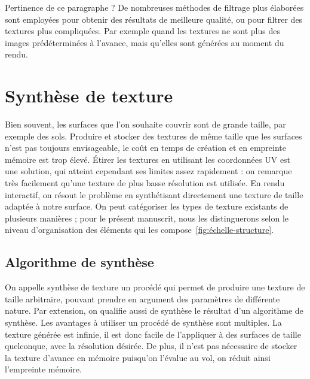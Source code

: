 {\color{red}Pertinence de ce paragraphe ?}
De nombreuses méthodes de filtrage plus élaborées sont employées pour obtenir des résultats de meilleure qualité, ou pour filtrer des textures plus compliquées. Par exemple quand les textures ne sont plus des images prédéterminées à l'avance, mais qu'elles sont générées au moment du rendu.

\section{Synthèse de texture}

Bien souvent, les surfaces que l'on souhaite couvrir sont de grande taille, par exemple des sols. Produire et stocker des textures de même taille que les surfaces n'est pas toujours envisageable, le coût en temps de création et en empreinte mémoire est trop élevé. Étirer les textures en utilisant les coordonnées UV est une solution, qui atteint cependant ses limites assez rapidement : on remarque très facilement qu'une texture de plus basse résolution est utilisée. En rendu interactif, on résout le problème en synthétisant directement une texture de taille adaptée à notre surface. On peut catégoriser les types de texture existants de plusieurs manières ; pour le présent manuscrit, nous les distinguerons selon le niveau d'organisation des éléments qui les compose~\ref{fig:échelle-structure}.

\subsection*{Algorithme de synthèse}

On appelle \og synthèse de texture \fg un procédé qui permet de produire une texture de taille arbitraire, pouvant prendre en argument des paramètres de différente nature. Par extension, on qualifie aussi de synthèse le résultat d'un algorithme de synthèse. Les avantages à utiliser un procédé de synthèse sont multiples. La texture générée est infinie, il est donc facile de l'appliquer à des surfaces de taille quelconque, avec la résolution désirée. De plus, il n'est pas nécessaire de stocker la texture d'avance en mémoire puisqu'on l'évalue au vol, on réduit ainsi l'empreinte mémoire.


\bigskip

